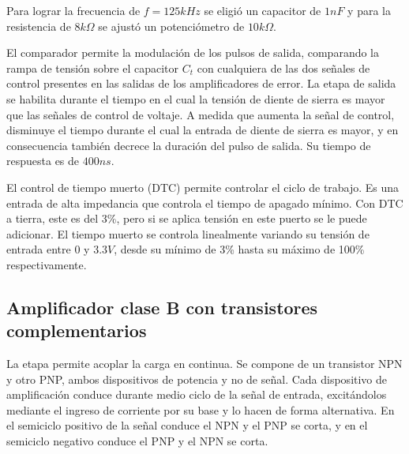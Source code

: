 Para lograr la frecuencia de $f=125kHz$ se eligió un capacitor de $1nF$ y para la resistencia de $8k\Omega$ se ajustó un potenciómetro de $10k\Omega$. 

El comparador permite la modulación de los pulsos de salida, comparando la rampa de tensión sobre el capacitor $C_t$ con cualquiera de las dos señales de control presentes en las salidas de los amplificadores de error.
La etapa de salida se habilita durante el tiempo en el cual la tensión de diente de sierra es mayor que las señales de control de voltaje. 
A medida que aumenta la señal de control, disminuye el tiempo durante el cual la entrada de diente de sierra es mayor, y en consecuencia también decrece la duración del pulso de salida. 
Su tiempo de respuesta es de $400ns$.

El control de tiempo muerto (DTC) permite controlar el ciclo de trabajo. 
Es una entrada de alta impedancia que controla el tiempo de apagado mínimo. Con DTC a tierra, este es del 3\%, pero si se aplica tensión en este puerto se le puede adicionar.
El tiempo muerto se controla linealmente variando su tensión de entrada entre $0$ y $3.3V$, desde su mínimo de 3\% hasta su máximo de 100\% respectivamente. 




\subsection{Amplificador clase B con transistores complementarios}

La etapa permite acoplar la carga en continua. 
Se compone de un transistor NPN y otro PNP, ambos dispositivos de potencia y no de señal. 
Cada dispositivo de amplificación conduce durante medio ciclo de la señal de entrada, 
excitándolos mediante el ingreso de corriente por su base y lo hacen de forma alternativa. 
En el semiciclo positivo de la señal conduce el NPN y el PNP se corta, y en el semiciclo negativo conduce el PNP y el NPN se corta.

